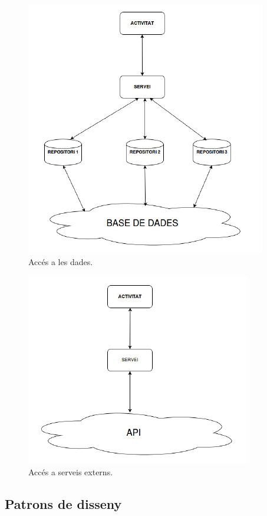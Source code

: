 \begin{itemize}
\begin{figure}[!h]
\centering
\includegraphics[scale=0.6]{Figures/AccesBD.jpg}
\caption{Accés a les dades.}
\end{figure}

\begin{figure}[!h]
\centering
\includegraphics[scale=0.7]{Figures/AccesAPI.jpg}
\caption{Accés a serveis externs.}
\end{figure}

\clearpage

\end{itemize}


\subsection{Patrons de disseny}

